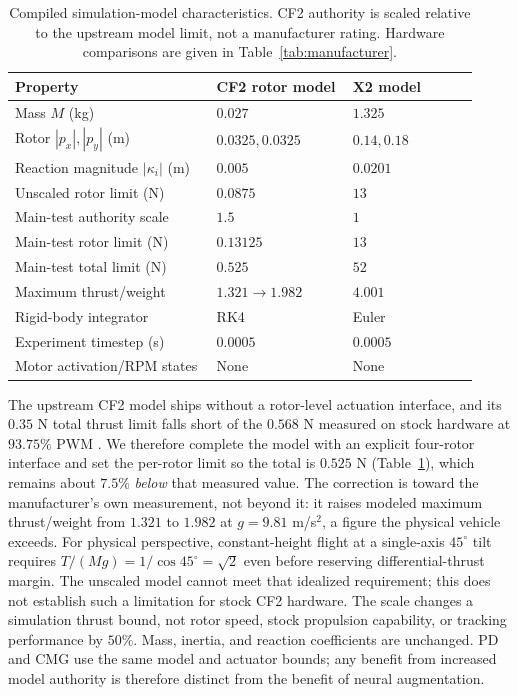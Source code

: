 \documentclass[letterpaper,10pt,conference]{IEEEtran}
\begin{document}
\begin{table}[!ht]
\centering
\caption{Compiled simulation-model characteristics. CF2 authority is
scaled relative to the upstream model limit, not a manufacturer rating.
Hardware comparisons are given in Table~\ref{tab:manufacturer}.}
\label{tab:models}
\setlength{\tabcolsep}{3pt}
\footnotesize
\begin{tabular}{@{}p{0.40\linewidth}p{0.27\linewidth}p{0.25\linewidth}@{}}
\toprule
Property & CF2 rotor model & X2 model\\
\midrule
Mass $M$ (kg) & $0.027$ & $1.325$\\
Rotor $|p_x|,|p_y|$ (m) & $0.0325,0.0325$ & $0.14,0.18$\\
Reaction magnitude $|\kappa_i|$ (m) & $0.005$ & $0.0201$\\
Unscaled rotor limit (N) & $0.0875$ & $13$\\
Main-test authority scale & $1.5$ & $1$\\
Main-test rotor limit (N) & $0.13125$ & $13$\\
Main-test total limit (N) & $0.525$ & $52$\\
Maximum thrust/weight & $1.321\to1.982$ & $4.001$\\
Rigid-body integrator & RK4 & Euler\\
Experiment timestep (s) & $0.0005$ & $0.0005$\\
Motor activation/RPM states & None & None\\
\bottomrule
\end{tabular}
\end{table}

The upstream CF2 model ships without a rotor-level actuation interface, and
its $0.35$ N total thrust limit falls short of the $0.568$ N measured on
stock hardware at $93.75\%$ PWM \cite{bitcrazeThrustMeasurements}. We
therefore complete the model with an explicit four-rotor interface and set
the per-rotor limit so the total is $0.525$ N (Table~\ref{tab:models}),
which remains about $7.5\%$ \emph{below} that measured value. The
correction is toward the manufacturer's own measurement, not beyond it: it
raises modeled maximum thrust/weight from $1.321$ to $1.982$ at
$g=9.81$ m/s$^2$, a figure the physical vehicle exceeds. For physical perspective,
constant-height flight at a single-axis $45^\circ$ tilt requires
$T/(Mg)=1/\cos45^\circ=\sqrt{2}$ even before reserving differential-thrust
margin. The unscaled model cannot meet that idealized requirement; this
does not establish such a limitation for stock CF2 hardware. The scale
changes a simulation thrust bound, not rotor speed, stock propulsion
capability, or tracking performance by $50\%$. Mass, inertia, and reaction
coefficients are unchanged. PD and CMG use the same model and actuator
bounds; any benefit from increased model authority is therefore distinct
from the benefit of neural augmentation.
\end{document}
